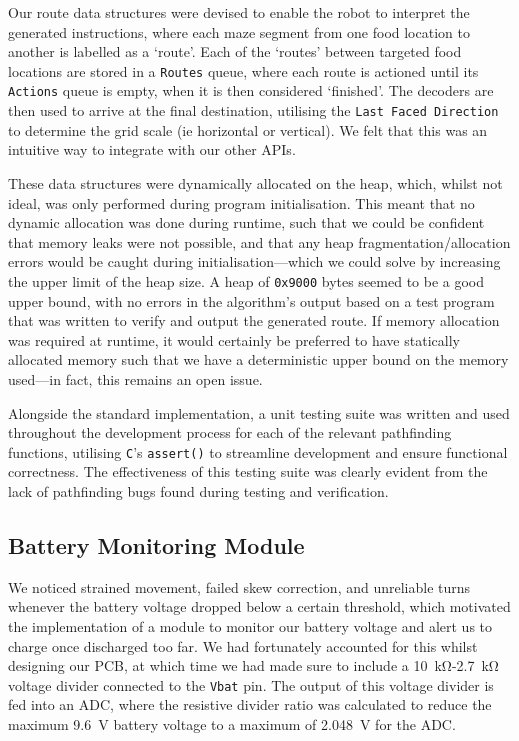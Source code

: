 \documentclass[conference]{IEEEtran}
\begin{document}
Our route data structures were devised to enable the robot to interpret the generated instructions, where each maze segment from one food location to another is labelled as a `route'.
Each of the `routes' between targeted food locations are stored in a \texttt{Routes} queue, where each route is actioned until its \texttt{Actions} queue is empty, when it is then considered `finished'.
The decoders are then used to arrive at the final destination, utilising the \texttt{Last Faced Direction} to determine the grid scale (ie horizontal or vertical).
We felt that this was an intuitive way to integrate with our other APIs.

These data structures were dynamically allocated on the heap, which, whilst not ideal, was only performed during program initialisation.
This meant that no dynamic allocation was done during runtime, such that we could be confident that memory leaks were not possible, and that any heap fragmentation/allocation errors would be caught during initialisation—which we could solve by increasing the upper limit of the heap size.
A heap of \texttt{0x9000} bytes seemed to be a good upper bound, with no errors in the algorithm's output based on a test program that was written to verify and output the generated route.
If memory allocation was required at runtime, it would certainly be preferred to have statically allocated memory such that we have a deterministic upper bound on the memory used—in fact, this remains an open issue.

Alongside the standard implementation, a unit testing suite was written and used throughout the development process for each of the relevant pathfinding functions, utilising \texttt{C}'s \texttt{assert()} to streamline development and ensure functional correctness.
The effectiveness of this testing suite was clearly evident from the lack of pathfinding bugs found during testing and verification.

\subsection{Battery Monitoring Module}

We noticed strained movement, failed skew correction, and unreliable turns whenever the battery voltage dropped below a certain threshold, which motivated the implementation of a module to monitor our battery voltage and alert us to charge once discharged too far.
We had fortunately accounted for this whilst designing our PCB, at which time we had made sure to include a \qty{10}{\kohm}-\qty{2.7}{\kohm} voltage divider connected to the \texttt{Vbat} pin.
The output of this voltage divider is fed into an ADC, where the resistive divider ratio was calculated to reduce the maximum \qty{9.6}{\volt} battery voltage to a maximum of \qty{2.048}{\volt} for the ADC.
\end{document}
